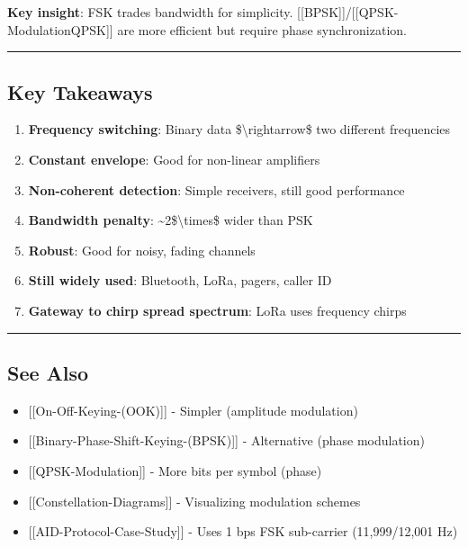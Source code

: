 \textbf{Key insight}: FSK trades bandwidth for simplicity.
{[}{[}BPSK{]}{]}/{[}{[}QPSK-Modulation\textbar QPSK{]}{]} are more
efficient but require phase synchronization.

\begin{center}\rule{0.5\linewidth}{0.5pt}\end{center}

\subsection{\texorpdfstring{ Key
Takeaways}{ Key Takeaways}}\label{key-takeaways}

\begin{enumerate}
\def\labelenumi{\arabic{enumi}.}
\tightlist
\item
  \textbf{Frequency switching}: Binary data
  \$\textbackslash rightarrow\$ two different frequencies
\item
  \textbf{Constant envelope}: Good for non-linear amplifiers
\item
  \textbf{Non-coherent detection}: Simple receivers, still good
  performance
\item
  \textbf{Bandwidth penalty}: \textasciitilde2\$\textbackslash times\$
  wider than PSK
\item
  \textbf{Robust}: Good for noisy, fading channels
\item
  \textbf{Still widely used}: Bluetooth, LoRa, pagers, caller ID
\item
  \textbf{Gateway to chirp spread spectrum}: LoRa uses frequency chirps
\end{enumerate}

\begin{center}\rule{0.5\linewidth}{0.5pt}\end{center}

\subsection{\texorpdfstring{ See Also}{ See Also}}\label{see-also}

\begin{itemize}
\tightlist
\item
  {[}{[}On-Off-Keying-(OOK){]}{]} - Simpler (amplitude modulation)
\item
  {[}{[}Binary-Phase-Shift-Keying-(BPSK){]}{]} - Alternative (phase
  modulation)
\item
  {[}{[}QPSK-Modulation{]}{]} - More bits per symbol (phase)
\item
  {[}{[}Constellation-Diagrams{]}{]} - Visualizing modulation schemes
\item
  {[}{[}AID-Protocol-Case-Study{]}{]} - Uses 1 bps FSK sub-carrier
  (11,999/12,001 Hz)
\end{itemize}


